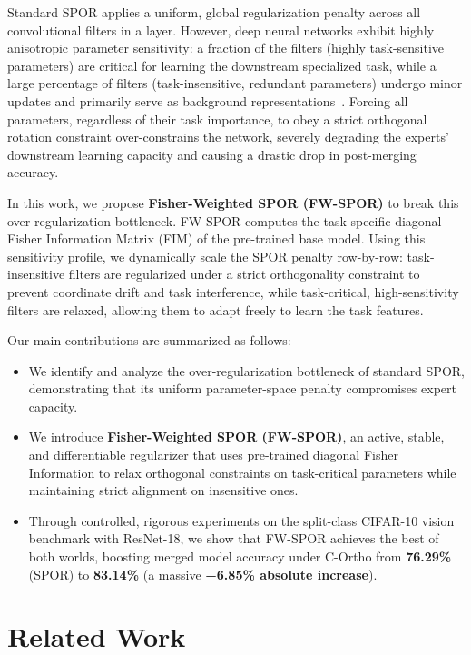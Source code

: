 \documentclass{article}
\theoremstyle{plain}
\theoremstyle{definition}
\theoremstyle{remark}
\begin{document}
Standard SPOR applies a uniform, global regularization penalty across all convolutional filters in a layer. However, deep neural networks exhibit highly anisotropic parameter sensitivity: a fraction of the filters (highly task-sensitive parameters) are critical for learning the downstream specialized task, while a large percentage of filters (task-insensitive, redundant parameters) undergo minor updates and primarily serve as background representations~\cite{niu2023towards}. Forcing all parameters, regardless of their task importance, to obey a strict orthogonal rotation constraint over-constrains the network, severely degrading the experts' downstream learning capacity and causing a drastic drop in post-merging accuracy.

In this work, we propose \textbf{Fisher-Weighted SPOR (FW-SPOR)} to break this over-regularization bottleneck. FW-SPOR computes the task-specific diagonal Fisher Information Matrix (FIM) of the pre-trained base model. Using this sensitivity profile, we dynamically scale the SPOR penalty row-by-row: task-insensitive filters are regularized under a strict orthogonality constraint to prevent coordinate drift and task interference, while task-critical, high-sensitivity filters are relaxed, allowing them to adapt freely to learn the task features. 

Our main contributions are summarized as follows:
\begin{itemize}
    \item We identify and analyze the over-regularization bottleneck of standard SPOR, demonstrating that its uniform parameter-space penalty compromises expert capacity.
    \item We introduce \textbf{Fisher-Weighted SPOR (FW-SPOR)}, an active, stable, and differentiable regularizer that uses pre-trained diagonal Fisher Information to relax orthogonal constraints on task-critical parameters while maintaining strict alignment on insensitive ones.
    \item Through controlled, rigorous experiments on the split-class CIFAR-10 vision benchmark with ResNet-18, we show that FW-SPOR achieves the best of both worlds, boosting merged model accuracy under C-Ortho from \textbf{76.29\%} (SPOR) to \textbf{83.14\%} (a massive \textbf{+6.85\% absolute increase}).
\end{itemize}

\section{Related Work}
\label{sec:related}
\end{document}
